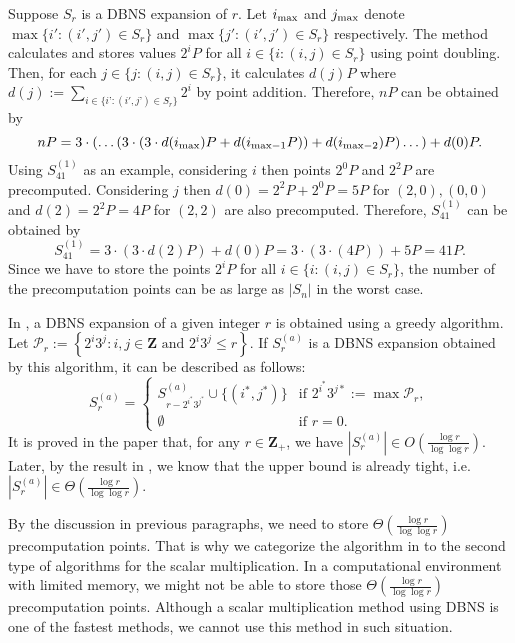 Suppose $S_r$ is a DBNS expansion of $r$. Let $i_{\rm max}$ and $j_{\rm max}$ denote $\max\{ i' : (i',j') \in S_r \}$ and $\max\{ j' : (i',j') \in S_r \}$ respectively.
The method \cite{MH09} calculates and stores values $2^iP$ for all $i \in \{i : (i, j) \in S_r \}$ using point doubling.
Then, for each $j \in \{j : (i, j) \in S_r \}$, it calculates $d(j)P$ where $d(j) := \sum\limits_{i \in \{i’ : (i',j’) \in S_r\}} 2^i $ by point addition.
Therefore, $nP$ can be obtained by
$$nP = 3\cdot \left( \dots \left( 3 \cdot \left( 3 \cdot d(i_{\rm max})P + d(i_{\mathrm{max} - 1}P) \right) + d(i_{\mathrm{max} - 2})P \right) \dots \right) + d(0)P.$$
Using $S_{41}^{(1)}$ as an example, considering $i$ then points $2^0P$ and $2^2P$ are precomputed.
Considering $j$ then $d(0) = 2^2P + 2^0P = 5P$ for $(2,0),(0,0)$ and $d(2) = 2^2P = 4P$ for $(2,2)$ are also precomputed.
Therefore, $S_{41}^{(1)}$ can be obtained by
$$S_{41}^{(1)} = 3 \cdot \left( 3 \cdot d(2)P  \right) + d(0)P = 3 \cdot \left( 3 \cdot \left( 4P \right)  \right) + 5P = 41P.$$
Since we have to store the points $2^iP$ for all $i \in \{i : (i,j) \in S_r\}$, the number of the precomputation points can be as large as $|S_n|$ in the worst case.

In \cite{dbns2}, a DBNS expansion of a given integer $r$ is obtained using a greedy algorithm.
Let $\mathcal{P}_r := \left\{ 2^i3^j : i,j \in \mathbf{Z} \text{ and } 2^i3^j \leq r \right\}$.
If $S^{(a)}_r$ is a DBNS expansion obtained by this algorithm,
it can be described as follows:
\[
S^{(a)}_r =
\begin{cases}
S^{(a)}_{r - 2^{i^*}3^{j^*}} \cup \{(i^*, j^*)\} & \text{if } 2^{i^*}3^{j*} := \max \mathcal{P}_r, \\
\emptyset       & \text{if } r = 0.
\end{cases}
\]
It is proved in the paper that, for any $r \in \mathbf{Z}_+$, we have $\left|S_r^{(a)}\right| \in O(\frac{\log r}{\log \log r})$.
Later, by the result in \cite{dbns3}, we know that the upper bound is already tight, i.e. $\left|S_r^{(a)}\right| \in \Theta(\frac{\log r}{\log \log r})$.

By the discussion in previous paragraphs, we need to store $\Theta(\frac{\log r}{\log \log r})$ precomputation points.
That is why we categorize the algorithm in \cite{MH09} to the second type of algorithms for the scalar multiplication.
In a computational environment with limited memory, we might not be able to store those $\Theta(\frac{\log r}{\log \log r})$ precomputation points.
Although a scalar multiplication method using DBNS is one of the fastest methods, we cannot use this method in such situation.

